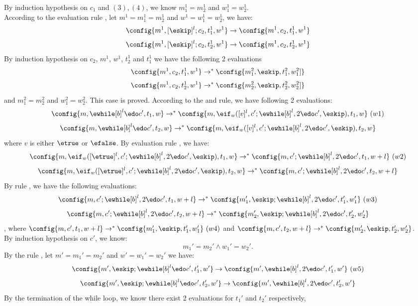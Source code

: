 {\begin{subproof}
\[\]
%
%
By induction hypothesis on $c_1$ and $(3), (4)$, we know $m_1^1= m_2^1$ and $w_1^1= w_2^1$.
%
\\
%
According to the evaluation rule , let $m^1 = m_1^1= m_2^1$ and $w^1 = w_1^1= w_2^1$, we have:
%
\[
\config{m^1, [\eskip]^l;c_2, t_1^1, w^1} \to \config{m^1, c_2, t_1^1, w^1}
\]
%
\[
\config{m^1, [\eskip]^l;c_2, t_2^1, w^1} \to \config{m^1, c_2, t_2^1, w^1}
\]
%
%
%
By induction hypothesis on $c_2$, $m^1$, $w^1$, $t_2^1$ and $t_1^1$ we have the following 2 evaluations 
%
\[
	\config{m^1, c_2, t_1^1, w^1} \to^{*} \config{m_1^2, \eskip, t_1^2, w_1^2]}
\]
%
\[
	\config{m^1, c_2, t_2^1, w^1} \to^{*} \config{m_2^2, \eskip, t_2^2, w_2^2]}
\]
%
and $m_1^2= m_2^2$ and $w_1^2= w_2^2$.
%
%
This case is proved.
%
%
According to the  and  rule, we have following 2 evaluations:
%
\[
	\config{m, \ewhile [b]^l \edo c', t_1, w} \to^{*}
	\config{m, \eif_w([v]^l, c';\ewhile [b]^l, 2 \edo c', \eskip), t_1, w} ~ (w1)
\]
%
\[
	\config{m, \ewhile [b]^l \edo c', t_2, w} \to^{*}
	\config{m, \eif_w([v]^l, c';\ewhile [b]^l, 2 \edo c', \eskip), t_2, w}
\]
%
where $v$ is either $\etrue$ or $\efalse$.
%
%
By evaluation rule , we have:
%
\[
	\config{m, \eif_w([\etrue]^l, c';\ewhile [b]^l, 2 \edo c', \eskip), t_1, w} 
	\to^{*} \config{m, c';\ewhile [b]^l, 2 \edo c', t_1, w+l} ~ (w2)
\]
%
\[
	\config{m, \eif_w([\etrue]^l, c';\ewhile [b]^l, 2 \edo c', \eskip), t_2, w} 
	\to^{*} \config{m, c';\ewhile [b]^l, 2 \edo c', t_2, w+l} 
\]
%
%
By rule , we have the following evaluations:
%
\[
	\config{m, c';\ewhile [b]^l, 2 \edo c', t_1, w+l} \to^{*} \config{m_1', \eskip;\ewhile [b]^l, 2 \edo c', t_1', w_1'}~ (w3)
\] 
%
%
\[
	\config{m, c';\ewhile [b]^l , 2 \edo c', t_2, w+l} \to^{*} \config{m_2', \eskip;\ewhile [b]^l, 2 \edo c', t_2', w_2'}
\] 
%
, where 
$\config{m, c', t_1, w+l} \to^{*} \config{m_1', \eskip, t_1', w_1'} ~ (w4)$
and
$\config{m, c', t_2, w+l} \to^{*} \config{m_2', \eskip, t_2', w_2'}$. 
%
\\
%
By induction hypothesis on $c'$, we know:
\[
m_1' = m_2' \land w_1' = w_2'.
\]
%
By the rule , let $m' = m_1' = m_2'$ and $w' = w_1' = w_2'$ we have:
%
\[
	\config{m', \eskip;\ewhile [b]^l \edo c', t_1', w'} \to \config{m', \ewhile [b]^l, 2 \edo c', t_1', w'} ~ (w5)
\]
%
\[
	\config{m', \eskip;\ewhile [b]^l \edo c', t_2', w'} \to \config{m', \ewhile [b]^l, 2 \edo c', t_2', w'}
\]
%
By the termination of the while loop, we know there exist 2 evaluations for $t_1'$ and $t_2'$ respectively,

\end{subproof}}

